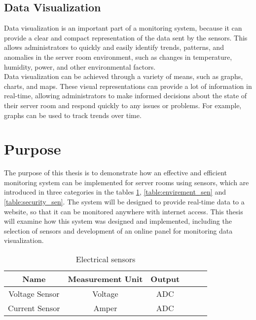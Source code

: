         \subsection{Data Visualization}
        Data visualization is an important part of a monitoring system, because it can provide a clear and compact representation of the data sent by the sensors. This allows administrators to quickly and easily identify trends, patterns, and anomalies in the server room environment, such as changes in temperature, humidity, power, and other environmental factors.\\
        Data visualization can be achieved through a variety of means, such as graphs, charts, and maps. These visual representations can provide a lot of information in real-time, allowing administrators to make informed decisions about the state of their server room and respond quickly to any issues or problems. For example, graphs can be used to track trends over time.

        \section{Purpose}
            The purpose of this thesis is to demonstrate how an effective and efficient monitoring system can be implemented for server rooms using sensors, which are introduced in three categories in the tables \ref{table:electrical_sensors}, \ref{table:envirement_sen} and \ref{table:security_sen}. The system will be designed to provide real-time data to a website, so that it can be monitored anywhere with internet access. This thesis will examine how this system was designed and implemented, including the selection of sensors and development of an online panel for monitoring data visualization.
            
            \begin{table}
                \centering
                \caption{Electrical sensors}
                \begin{tabular}{ |c|c|c|c|c|c|}
                \hline
                {\textbf{Name}} & {\textbf{Measurement Unit}} & {\textbf{Output}} \\ 
                \hline

                Voltage Sensor & Voltage &  ADC \\
                \hline
                
                Current Sensor & Amper &  ADC \\
                \hline
                \end{tabular}
                \label {table:electrical_sensors}
            \end{table}
               

